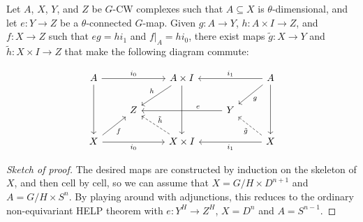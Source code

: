 \documentclass{willowtreebook}
\begin{document}
\begin{proposition}
Let $A$, $X$, $Y$, and $Z$ be $G$-CW complexes such that $A \subseteq X$ is $\theta$-dimensional,
and let $e \colon Y \to Z$ be a $\theta$-connected $G$-map. Given $g \colon A \to Y$, $h \colon A \times I \to Z$, and $f \colon X \to Z$ such that $eg = hi_1$ and
$f|_A = hi_0$, there exist maps $\widetilde{g} \colon X \to Y$ and $\widetilde{h} \colon X \times I \to Z$ that make the following diagram commute:

\[\begin{tikzcd}[ampersand replacement=\&]
    A \&\& {A \times I} \&\& A \\
    \& Z \&\& Y \\
    X \&\& {X \times I} \&\& X
    \arrow["{i_0}", from=1-1, to=1-3]
    \arrow["{i_1}"', from=1-5, to=1-3]
    \arrow[from=1-1, to=3-1]
    \arrow["f"', from=3-1, to=2-2]
    \arrow["h"', from=1-3, to=2-2]
    \arrow[from=1-3, to=3-3]
    \arrow["{i_0}"', from=3-1, to=3-3]
    \arrow["{i_1}", from=3-5, to=3-3]
    \arrow[from=1-5, to=3-5]
    \arrow["g", from=1-5, to=2-4]
    \arrow["{\tilde g}", dashed, from=3-5, to=2-4]
    \arrow["e"'{pos=0.3}, from=2-4, to=2-2]
    \arrow["{\tilde{h}}"', dashed, from=3-3, to=2-2]
\end{tikzcd}\]
\end{proposition}
\begin{proof}[Sketch of proof]
The desired maps are constructed by induction on the skeleton of $X$, and then cell by cell, so we can assume that $X = G/H \times D^{n+1}$ and $A = G/H \times S^{n}$. By playing around with adjunctions, this reduces to the ordinary non-equivariant HELP theorem with $e \colon Y^H \to Z^H$, $X = D^n$ and $A = S^{n-1}$. 
\end{proof}
\end{document}
